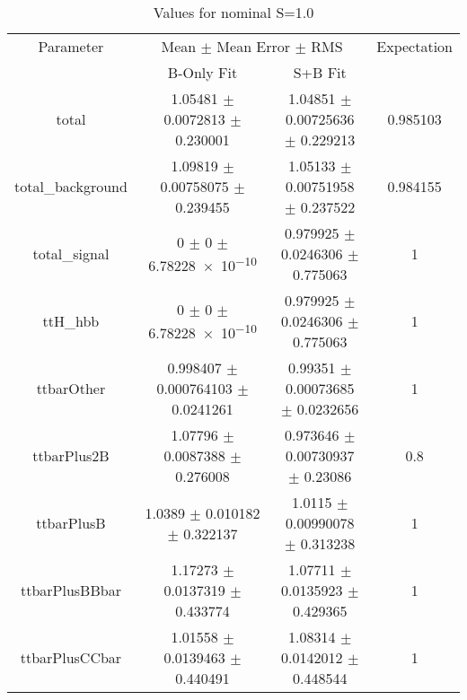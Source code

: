 \begin{table}
\centering
\caption{Values for nominal S=1.0}
\begin{tabular}{cccc}
\toprule
Parameter & \multicolumn{2}{c}{Mean $\pm$ Mean Error $\pm$ RMS} & Expectation\\
 & B-Only Fit & S+B Fit & \\
\midrule
total & \num{1.05481} $\pm$ \num{0.0072813} $\pm$ \num{0.230001} & \num{1.04851} $\pm$ \num{0.00725636} $\pm$ \num{0.229213} & \num{0.985103}\\
total\_background & \num{1.09819} $\pm$ \num{0.00758075} $\pm$ \num{0.239455} & \num{1.05133} $\pm$ \num{0.00751958} $\pm$ \num{0.237522} & \num{0.984155}\\
total\_signal & \num{0} $\pm$ \num{0} $\pm$ \num{6.78228e-10} & \num{0.979925} $\pm$ \num{0.0246306} $\pm$ \num{0.775063} & \num{1}\\
ttH\_hbb & \num{0} $\pm$ \num{0} $\pm$ \num{6.78228e-10} & \num{0.979925} $\pm$ \num{0.0246306} $\pm$ \num{0.775063} & \num{1}\\
ttbarOther & \num{0.998407} $\pm$ \num{0.000764103} $\pm$ \num{0.0241261} & \num{0.99351} $\pm$ \num{0.00073685} $\pm$ \num{0.0232656} & \num{1}\\
ttbarPlus2B & \num{1.07796} $\pm$ \num{0.0087388} $\pm$ \num{0.276008} & \num{0.973646} $\pm$ \num{0.00730937} $\pm$ \num{0.23086} & \num{0.8}\\
ttbarPlusB & \num{1.0389} $\pm$ \num{0.010182} $\pm$ \num{0.322137} & \num{1.0115} $\pm$ \num{0.00990078} $\pm$ \num{0.313238} & \num{1}\\
ttbarPlusBBbar & \num{1.17273} $\pm$ \num{0.0137319} $\pm$ \num{0.433774} & \num{1.07711} $\pm$ \num{0.0135923} $\pm$ \num{0.429365} & \num{1}\\
ttbarPlusCCbar & \num{1.01558} $\pm$ \num{0.0139463} $\pm$ \num{0.440491} & \num{1.08314} $\pm$ \num{0.0142012} $\pm$ \num{0.448544} & \num{1}\\
\bottomrule
\end{tabular}
\end{table}
